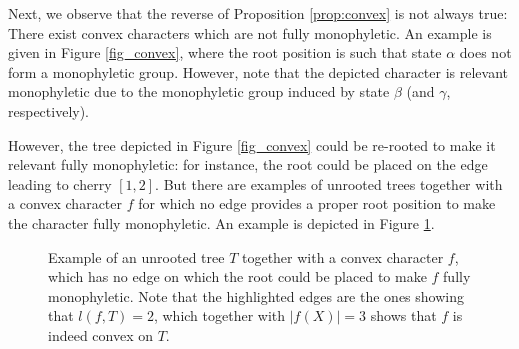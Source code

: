 \documentclass{amsart}
\theoremstyle{definition}
\begin{document}
Next, we observe that the reverse of Proposition \ref{prop:convex} is not always true: There exist convex characters which are not fully monophyletic. An example is given in Figure \ref{fig_convex}, where the root position is such that state $\alpha$ does not form a monophyletic group. However, note that the depicted character is relevant monophyletic due to the monophyletic group induced by state $\beta$ (and $\gamma$, respectively). 

However, the tree depicted in Figure \ref{fig_convex} could be re-rooted to make it relevant fully monophyletic: for instance, the root could be placed on the edge leading to cherry $[1,2]$. But there are examples of unrooted trees together with a convex character $f$ for which no edge provides a proper root position to make the character fully monophyletic. An example is depicted in Figure \ref{fig_convex2}. 

\begin{figure}[htbp]
\centering
{}
\caption{Example of an unrooted tree $T$ together with a convex character $f$, which has no edge on which the root could be placed to make $f$ fully monophyletic. Note that the highlighted edges are the ones showing that $l(f,T)=2$, which together with $|f(X)|=3$ shows that $f$ is indeed convex on $T$.}\label{fig_convex2}
\end{figure}
\end{document}
